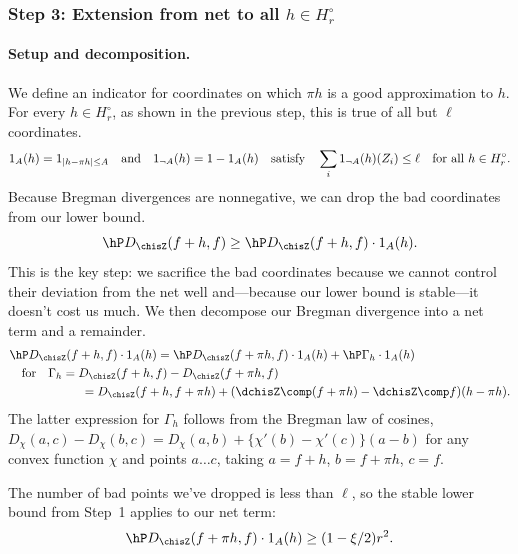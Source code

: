 \documentclass{article}
\begin{document}
\subsubsection{Step 3: Extension from net to all $h \in H_r^\circ$}

\paragraph{Setup and decomposition.}

We define an indicator for coordinates on which $\pi h$ is a good approximation to $h$. For every $h \in H_r^\circ$, as shown in the previous step, this is true of all but $\ell$ coordinates.
\[
1_A(h) = 1_{|h - \pi h| \le A} \qand 1_{\neg A}(h)=1-1_{A}(h) \qqtext{satisfy} \sum_i 1_{\neg A}(h)(Z_i) \le \ell \quad \text{for all } h \in H_r^\circ.
\]
Because Bregman divergences are nonnegative, we can drop the bad coordinates from our lower bound.
\begin{equation}\label{eq:drop-J}
\hP D_{\chisZ}(f+h, f) \ge \hP D_{\chisZ}(f+h, f) \cdot 1_A(h).
\end{equation}
This is the key step: we sacrifice the bad coordinates because we cannot control their deviation from the net well and---because our lower bound is stable---it doesn't cost us much. We then decompose our Bregman divergence into a net term and a remainder.
\begin{equation}\label{eq:decomp-Jc}
\begin{aligned}
&\hP D_{\chisZ}(f+h, f) \cdot 1_A(h) = \hP D_{\chisZ}(f+\pi h, f) \cdot 1_A(h) + \hP \Gamma_h \cdot 1_A(h) \\
&\qfor \Gamma_h = D_{\chisZ}(f+h, f) - D_{\chisZ}(f+\pi h, f) \\
&\hphantom{\qfor \hP \Gamma_h} = D_{\chisZ}(f+h, f+\pi h) + (\dchisZ \comp (f+\pi h) - \dchisZ \comp f)(h - \pi h).
\end{aligned}
\end{equation}
The latter expression for $\Gamma_h$ follows from the Bregman law of cosines,
$D_{\chi}(a,c) - D_\chi(b,c) = D_\chi(a,b) + \{\chi'(b) - \chi'(c)\}(a-b)$
for any convex function $\chi$ and points $a\ldots c$, taking $a = f+h$, $b = f+\pi h$, $c = f$.

The number of bad points we've dropped is less than $\ell$, so the stable lower bound from Step~1 applies to our net term:
\begin{equation}\label{eq:net-Jc}
\hP D_{\chisZ}(f+\pi h, f) \cdot 1_A(h) \ge (1 - \xi/2) r^2.
\end{equation}
\end{document}
